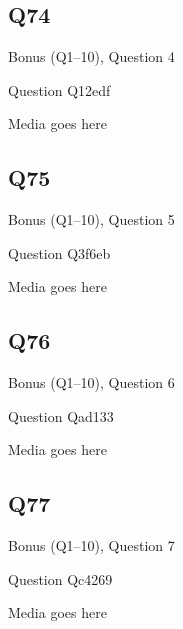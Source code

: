 \documentclass[11pt]{beamer}
\begin{document}
\subsection*{Q74}
\begin{frame}[t]{Bonus (Q1--10), Question 4}
\vspace{2em}
\begin{block}{Question}
Q12edf
\end{block}
\begin{center}
Media goes here
\end{center}
\end{frame}
    

\subsection*{Q75}
\begin{frame}[t]{Bonus (Q1--10), Question 5}
\vspace{2em}
\begin{block}{Question}
Q3f6eb
\end{block}
\begin{center}
Media goes here
\end{center}
\end{frame}
    

\subsection*{Q76}
\begin{frame}[t]{Bonus (Q1--10), Question 6}
\vspace{2em}
\begin{block}{Question}
Qad133
\end{block}
\begin{center}
Media goes here
\end{center}
\end{frame}
    

\subsection*{Q77}
\begin{frame}[t]{Bonus (Q1--10), Question 7}
\vspace{2em}
\begin{block}{Question}
Qc4269
\end{block}
\begin{center}
Media goes here
\end{center}
\end{frame}
    
\end{document}
